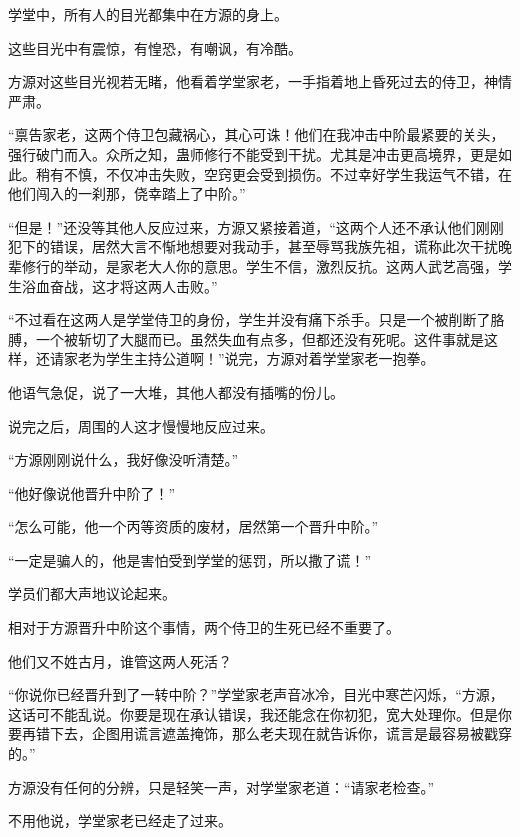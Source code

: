 
\begin{this_body}



学堂中，所有人的目光都集中在方源的身上。

这些目光中有震惊，有惶恐，有嘲讽，有冷酷。

方源对这些目光视若无睹，他看着学堂家老，一手指着地上昏死过去的侍卫，神情严肃。

“禀告家老，这两个侍卫包藏祸心，其心可诛！他们在我冲击中阶最紧要的关头，强行破门而入。众所之知，蛊师修行不能受到干扰。尤其是冲击更高境界，更是如此。稍有不慎，不仅冲击失败，空窍更会受到损伤。不过幸好学生我运气不错，在他们闯入的一刹那，侥幸踏上了中阶。”

“但是！”还没等其他人反应过来，方源又紧接着道，“这两个人还不承认他们刚刚犯下的错误，居然大言不惭地想要对我动手，甚至辱骂我族先祖，谎称此次干扰晚辈修行的举动，是家老大人你的意思。学生不信，激烈反抗。这两人武艺高强，学生浴血奋战，这才将这两人击败。”

“不过看在这两人是学堂侍卫的身份，学生并没有痛下杀手。只是一个被削断了胳膊，一个被斩切了大腿而已。虽然失血有点多，但都还没有死呢。这件事就是这样，还请家老为学生主持公道啊！”说完，方源对着学堂家老一抱拳。

他语气急促，说了一大堆，其他人都没有插嘴的份儿。

说完之后，周围的人这才慢慢地反应过来。

“方源刚刚说什么，我好像没听清楚。”

“他好像说他晋升中阶了！”

“怎么可能，他一个丙等资质的废材，居然第一个晋升中阶。”

“一定是骗人的，他是害怕受到学堂的惩罚，所以撒了谎！”

学员们都大声地议论起来。

相对于方源晋升中阶这个事情，两个侍卫的生死已经不重要了。

他们又不姓古月，谁管这两人死活？

“你说你已经晋升到了一转中阶？”学堂家老声音冰冷，目光中寒芒闪烁，“方源，这话可不能乱说。你要是现在承认错误，我还能念在你初犯，宽大处理你。但是你要再错下去，企图用谎言遮盖掩饰，那么老夫现在就告诉你，谎言是最容易被戳穿的。”

方源没有任何的分辨，只是轻笑一声，对学堂家老道：“请家老检查。”

不用他说，学堂家老已经走了过来。


\end{this_body}
